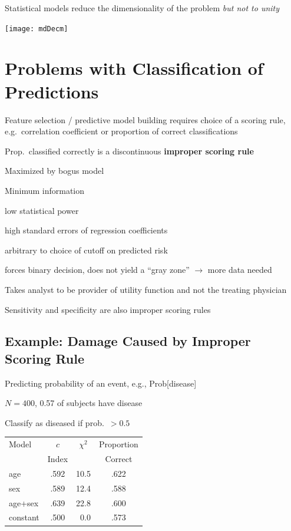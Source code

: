 Statistical models reduce the dimensionality of the problem \emph{but
    not to unity}

\centerline{\texttt{[image: mdDecm]}}

\section{Problems with Classification of Predictions}%
\bi
\item Feature selection / predictive model building requires choice of
a scoring rule, e.g.\ correlation coefficient or proportion of correct
classifications
\item Prop.\ classified correctly is a discontinuous \textbf{improper scoring
    rule}
 \bi
 \item Maximized by bogus model 
 \ei
\item Minimum information
 \bi
 \item low statistical power
 \item high standard errors of regression coefficients
 \item arbitrary to choice of cutoff on predicted risk
 \item forces binary decision, does not yield a ``gray zone''
   $\rightarrow$ more data needed
 \ei
\item Takes analyst to be provider of utility function and not the
 treating physician
\item Sensitivity and specificity are also improper scoring rules
\ei


\subsection{Example: Damage Caused by Improper Scoring Rule}
\bi
\item Predicting probability of an event, e.g., Prob[disease]
\item $N=400$, 0.57 of subjects have disease
\item Classify as diseased if prob.\ $>0.5$
\ei
\begin{center}\begin{tabular}{lccc}\hline
Model & $c$   & $\chi^{2}$ & Proportion \\
      & Index &            & Correct \\ \hline
age     & .592 & 10.5 & .622\\
sex     & .589 & 12.4 & .588\\
age+sex & .639 & 22.8 & .600\\
constant &.500 & ~0.0 & .573\\ \hline
\end{tabular}\end{center}

